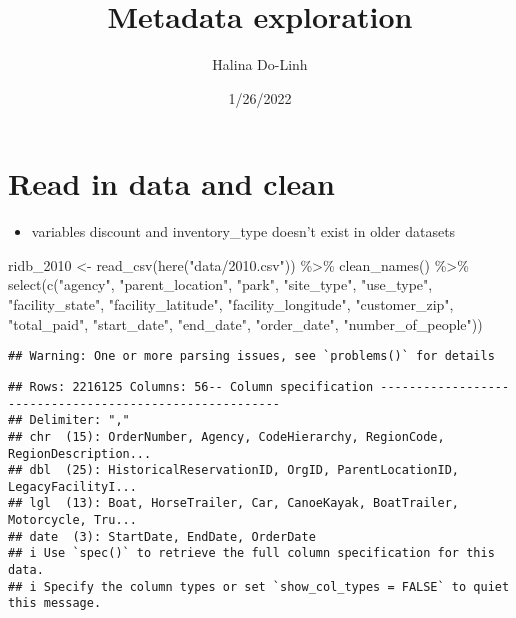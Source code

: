 \documentclass[
]{article}
\title{Metadata exploration}
\author{Halina Do-Linh}
\date{1/26/2022}
\newenvironment{Shaded}{\begin{snugshade}}{\end{snugshade}}
\newcommand{\FunctionTok}[1]{\textcolor[rgb]{0.00,0.00,0.00}{#1}}
\newcommand{\NormalTok}[1]{#1}
\newcommand{\OtherTok}[1]{\textcolor[rgb]{0.56,0.35,0.01}{#1}}
\newcommand{\SpecialCharTok}[1]{\textcolor[rgb]{0.00,0.00,0.00}{#1}}
\newcommand{\StringTok}[1]{\textcolor[rgb]{0.31,0.60,0.02}{#1}}
\providecommand{\tightlist}{%
  \setlength{\itemsep}{0pt}\setlength{\parskip}{0pt}}
\begin{document}
\maketitle

\hypertarget{read-in-data-and-clean}{%
\section{Read in data and clean}\label{read-in-data-and-clean}}

\begin{itemize}
\tightlist
\item
  variables discount and inventory\_type doesn't exist in older datasets
\end{itemize}

\begin{Shaded}
\begin{Highlighting}[]
\NormalTok{ridb\_2010 }\OtherTok{\textless{}{-}} \FunctionTok{read\_csv}\NormalTok{(}\FunctionTok{here}\NormalTok{(}\StringTok{"data/2010.csv"}\NormalTok{)) }\SpecialCharTok{\%\textgreater{}\%} 
  \FunctionTok{clean\_names}\NormalTok{() }\SpecialCharTok{\%\textgreater{}\%} 
  \FunctionTok{select}\NormalTok{(}\FunctionTok{c}\NormalTok{(}\StringTok{"agency"}\NormalTok{,}
           \StringTok{"parent\_location"}\NormalTok{,}
           \StringTok{"park"}\NormalTok{,}
           \StringTok{"site\_type"}\NormalTok{,}
           \StringTok{"use\_type"}\NormalTok{,}
           \StringTok{"facility\_state"}\NormalTok{,}
           \StringTok{"facility\_latitude"}\NormalTok{,}
           \StringTok{"facility\_longitude"}\NormalTok{,}
           \StringTok{"customer\_zip"}\NormalTok{,}
           \StringTok{"total\_paid"}\NormalTok{,}
           \StringTok{"start\_date"}\NormalTok{,}
           \StringTok{"end\_date"}\NormalTok{,}
           \StringTok{"order\_date"}\NormalTok{,}
           \StringTok{"number\_of\_people"}\NormalTok{))}
\end{Highlighting}
\end{Shaded}

\begin{verbatim}
## Warning: One or more parsing issues, see `problems()` for details
\end{verbatim}

\begin{verbatim}
## Rows: 2216125 Columns: 56-- Column specification --------------------------------------------------------
## Delimiter: ","
## chr  (15): OrderNumber, Agency, CodeHierarchy, RegionCode, RegionDescription...
## dbl  (25): HistoricalReservationID, OrgID, ParentLocationID, LegacyFacilityI...
## lgl  (13): Boat, HorseTrailer, Car, CanoeKayak, BoatTrailer, Motorcycle, Tru...
## date  (3): StartDate, EndDate, OrderDate
## i Use `spec()` to retrieve the full column specification for this data.
## i Specify the column types or set `show_col_types = FALSE` to quiet this message.
\end{verbatim}
\end{document}
